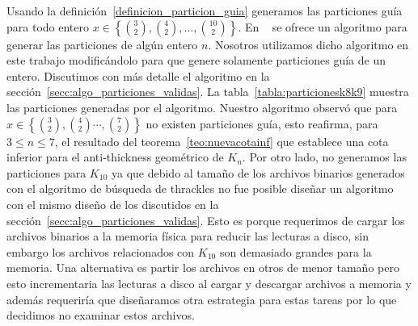     Usando la definición~\ref{definicion_particion_guia} generamos las particiones guía para todo entero
    $x\in \left\{ \binom{3}{2}, \binom{4}{2}, \dots, \binom{10}{2}\right\}$.
    En ~\cite{Knuth2011} se ofrece un algoritmo para
    generar las particiones de algún entero $n$. Nosotros utilizamos
    dicho algoritmo en este trabajo modificándolo para que genere solamente
    particiones guía de un entero. Discutimos con más detalle el algoritmo en
    la sección~\ref{secc:algo_particiones_validas}.
    La tabla~\ref{tabla:particionesk8k9} muestra las particiones generadas por el
    algoritmo. Nuestro algoritmo observó que para $x\in \left\{\binom{3}{2},\binom{4}{2}
    \cdots,\binom{7}{2}\right\}$ no existen particiones guía, esto reafirma,
    para $ 3\leq n\leq 7$, el resultado del teorema~\ref{teo:nuevacotainf}
    que establece una cota inferior para el anti-thickness geométrico de $K_n$. Por otro lado,
    no generamos las particiones para $K_{10}$ ya que debido al tamaño de los archivos binarios
    generados con el algoritmo de búsqueda de thrackles no fue posible diseñar un algoritmo con el
    mismo diseño de los discutidos en la sección~\ref{secc:algo_particiones_validas}. Esto es
    porque requerimos de cargar los archivos binarios a la memoria física para reducir las lecturas
    a disco, sin embargo los archivos relacionados con $K_10$ son demasiado grandes para la
    memoria. Una alternativa es partir los archivos en otros de menor tamaño pero esto
    incrementaria las lecturas a disco al cargar y descargar archivos a memoria y además requeriría
    que diseñaramos otra estrategia para estas tareas por lo que decidimos no examinar estos
    archivos.
